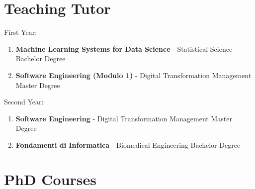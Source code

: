 \documentclass[runningheads]{llncs}
\begin{document}
\section{Teaching Tutor}
First Year:
\begin{enumerate}
    \item \textbf{Machine Learning Systems for Data Science} - Statistical Science Bachelor Degree
    \item \textbf{Software Engineering (Modulo 1)} - Digital Transformation Management Master Degree
\end{enumerate}
\noindent
Second Year:
\begin{enumerate}
    \item \textbf{Software Engineering} - Digital Transformation Management Master Degree
    \item \textbf{Fondamenti di Informatica} - Biomedical Engineering Bachelor Degree
\end{enumerate}

\section{PhD Courses}
\end{document}
